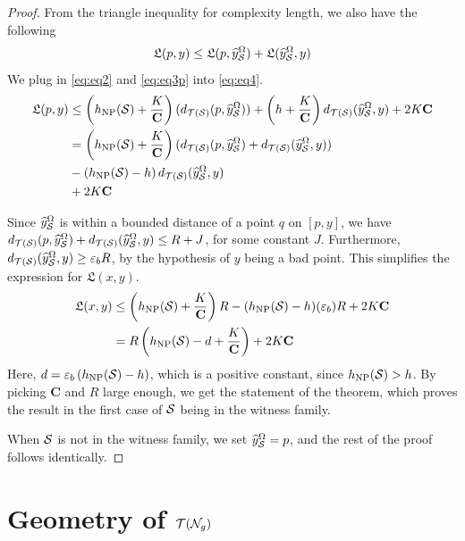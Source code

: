 \documentclass[12pt, reqno]{amsart}
\begin{document}
\begin{proof}
From the triangle inequality for complexity length, we also have the following
\begin{align}
  \label{eq:eq4}
  \mathfrak{L}(p, y) \leq \mathfrak{L}(p, \widehat{y}_{\mathcal{S}}^{\Omega}) + \mathfrak{L}(\widehat{y}_{\mathcal{S}}^{\Omega}, y)
\end{align}
We plug in \eqref{eq:eq2} and \eqref{eq:eq3p} into \eqref{eq:eq4}.
\begin{align*}
  \mathfrak{L}(p, y) &\leq \left( h_{\mathrm{NP}}(\mathcal{S}) + \frac{K}{\mathbf{C}} \right) (d_{\mathcal{T}(\mathcal{S})}(p, \widehat{y}_{\mathcal{S}}^{\Omega})) + \left( h + \frac{K}{\mathbf{C}} \right) d_{\mathcal{T}(\mathcal{S})}(\widehat{y}_{\mathcal{S}}^{\Omega}, y) +  2K \mathbf{C} \\
                     &= \left( h_{\mathrm{NP}}(\mathcal{S}) + \frac{K}{\mathbf{C}} \right) (d_{\mathcal{T}(\mathcal{S})}(p, \widehat{y}_{\mathcal{S}}^{\Omega}) + d_{\mathcal{T}(\mathcal{S})}(\widehat{y}_{\mathcal{S}}^{\Omega}, y)) \\
                     &- \left( h_{\mathrm{NP}}(\mathcal{S}) - h \right) d_{\mathcal{T}(\mathcal{S})}(\widehat{y}_{\mathcal{S}}^{\Omega}, y) \\
  &+  2K \mathbf{C}
\end{align*}

Since $\widehat{y}_{\mathcal{S}}^\Omega$ is within a bounded distance of a point $q$ on $[p, y]$, we have $d_{\mathcal{T}(\mathcal{S})}(p, \widehat{y}_{\mathcal{S}}^{\Omega}) + d_{\mathcal{T}(\mathcal{S})}(\widehat{y}_{\mathcal{S}}^{\Omega}, y) \leq R + J$, for some constant $J$.
Furthermore, $d_{\mathcal{T}(\mathcal{S})}(\widehat{y}_{\mathcal{S}}^{\Omega}, y) \geq \varepsilon_b R$, by the hypothesis of $y$ being a bad point.
This simplifies the expression for $\mathfrak{L}(x,y)$.
\begin{align*}
  \mathfrak{L}(x,y) &\leq \left( h_{\mathrm{NP}}(\mathcal{S}) + \frac{K}{\mathbf{C}} \right) R - (h_{\mathrm{NP}}(\mathcal{S}) - h)(\varepsilon_b) R + 2K \mathbf{C} \\
  &= R \left( h_{\mathrm{NP}}(\mathcal{S}) - d + \frac{K}{\mathbf{C}} \right) + 2K\mathbf{C}
\end{align*}
Here, $d = \varepsilon_b \left( h_{\mathrm{NP}}(\mathcal{S}) - h \right)$, which is a positive constant, since $h_{\mathrm{NP}}(\mathcal{S}) > h$.
By picking $\mathbf{C}$ and $R$ large enough, we get the statement of the theorem, which proves the result in the first case of $\mathcal{S}$ being in the witness family.

When $\mathcal{S}$ is not in the witness family, we set $\widehat{y}_{\mathcal{S}}^{\Omega} = p$, and the rest of the proof follows identically.
\end{proof}
\appendix

\section{Geometry of $\mathcal{T}(\mathcal{N}_g)$}
\label{sec:geom-of-teich}
\end{document}
